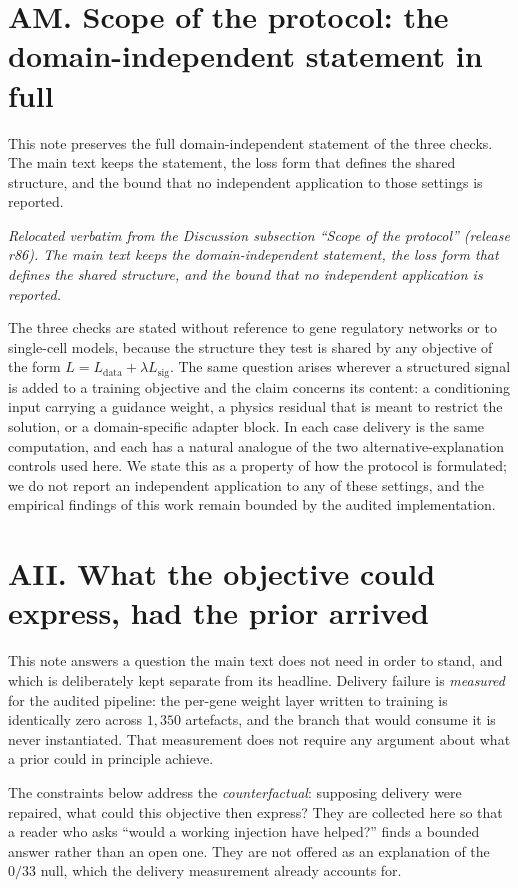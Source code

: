 \documentclass[11 pt,a4 paper]{article}
\begin{document}
\clearpage

\section*{AM. Scope of the protocol: the domain-independent statement in full}

This note preserves the full domain-independent statement of the three checks. The main text keeps
the statement, the loss form that defines the shared structure, and the bound that no independent
application to those settings is reported.

\noindent\emph{Relocated verbatim from the Discussion subsection ``Scope of the protocol'' (release r86). The main text keeps the domain-independent statement, the loss form that defines the shared structure, and the bound that no independent application is reported.}

The three checks are stated without reference to gene regulatory networks or to
single-cell models, because the structure they test is shared by any objective of
the form $L = L_{\text{data}} + \lambda L_{\text{sig}}$. The same question arises
wherever a structured signal is added to a training objective and the claim
concerns its content: a conditioning input carrying a guidance weight, a physics
residual that is meant to restrict the solution, or a domain-specific adapter
block. In each case delivery is the same computation, and each has a natural
analogue of the two alternative-explanation controls used here. We state this as
a property of how the protocol is formulated; we do not report an independent
application to any of these settings, and the empirical findings of this work
remain bounded by the audited implementation.

\section*{AII. What the objective could express, had the prior arrived}

This note answers a question the main text does not need in order to stand, and which is
deliberately kept separate from its headline. Delivery failure is \emph{measured} for the
audited pipeline: the per-gene weight layer written to training is identically zero across
$1{,}350$ artefacts, and the branch that would consume it is never instantiated. That
measurement does not require any argument about what a prior could in principle achieve.

The constraints below address the \emph{counterfactual}: supposing delivery were repaired,
what could this objective then express? They are collected here so that a reader who asks
``would a working injection have helped?'' finds a bounded answer rather than an open one.
They are not offered as an explanation of the $0/33$ null, which the delivery measurement
already accounts for.
\end{document}
